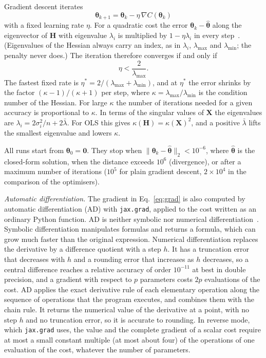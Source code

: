 \documentclass[aps,reprint,amsmath,amssymb,nofootinbib,floatfix]{revtex4-2}
\newcommand{\lb}{\bar\lambda}
\newcommand{\norm}[1]{\lVert #1\rVert}
\begin{document}
Gradient descent iterates
\begin{equation}
  \bm\theta_{k+1}=\bm\theta_k-\eta\,\nabla C(\bm\theta_k)
  \label{eq:gd}
\end{equation}
with a fixed learning rate $\eta$. For a quadratic cost the error $\bm\theta_k-\hat{\bm\theta}$
along the eigenvector of $\bm H$ with eigenvalue $\lambda_i$ is multiplied by $1-\eta\lambda_i$ in
every step~\cite{hjorthjensen2026}. (Eigenvalues of the Hessian always carry an index, as in
$\lambda_i$, $\lambda_{\max}$ and $\lambda_{\min}$; the penalty never does.) The iteration therefore
converges if and only if
\begin{equation}
  \eta<\frac{2}{\lambda_{\max}} .
  \label{eq:etamax}
\end{equation}
The fastest fixed rate is $\eta^*=2/(\lambda_{\max}+\lambda_{\min})$, and at $\eta^*$ the error
shrinks by the factor $(\kappa-1)/(\kappa+1)$ per step, where
$\kappa=\lambda_{\max}/\lambda_{\min}$ is the condition number of the Hessian. For large $\kappa$
the number of iterations needed for a given accuracy is proportional to $\kappa$. In terms of the
singular values of $\bm X$ the eigenvalues are $\lambda_i=2\sigma_i^2/n+2\lb$. For OLS this gives
$\kappa(\bm H)=\kappa(\bm X)^2$, and a positive $\lb$ lifts the smallest eigenvalue and lowers
$\kappa$.

All runs start from $\bm\theta_0=\bm0$. They stop when
$\norm{\bm\theta_k-\hat{\bm\theta}}_2<10^{-6}$, where $\hat{\bm\theta}$ is the closed-form solution,
when the distance exceeds $10^6$ (divergence), or after a maximum number of iterations ($10^5$ for
plain gradient descent, $2\times10^4$ in the comparison of the optimisers).

\emph{Automatic differentiation.} The gradient in Eq.~\eqref{eq:grad} is also computed by automatic
differentiation (AD) with \texttt{jax.grad}, applied to the cost written as an ordinary Python
function. AD is neither symbolic nor numerical differentiation~\cite{baydin2018,hjorthjensen2026}.
Symbolic differentiation manipulates formulas and returns a formula, which can grow much faster
than the original expression. Numerical differentiation replaces the derivative by a difference
quotient with a step $h$. It has a truncation error that decreases with $h$ and a rounding error
that increases as $h$ decreases, so a central difference reaches a relative accuracy of order
$10^{-11}$ at best in double precision, and a gradient with respect to $p$ parameters costs $2p$
evaluations of the cost. AD applies the exact derivative rule of each elementary operation along
the sequence of operations that the program executes, and combines them with the chain rule. It
returns the numerical value of the derivative at a point, with no step $h$ and no truncation
error, so it is accurate to rounding. In reverse mode, which \texttt{jax.grad} uses, the value and
the complete gradient of a scalar cost require at most a small constant multiple (at most about
four) of the operations of one evaluation of the cost, whatever the number of parameters.
\end{document}
